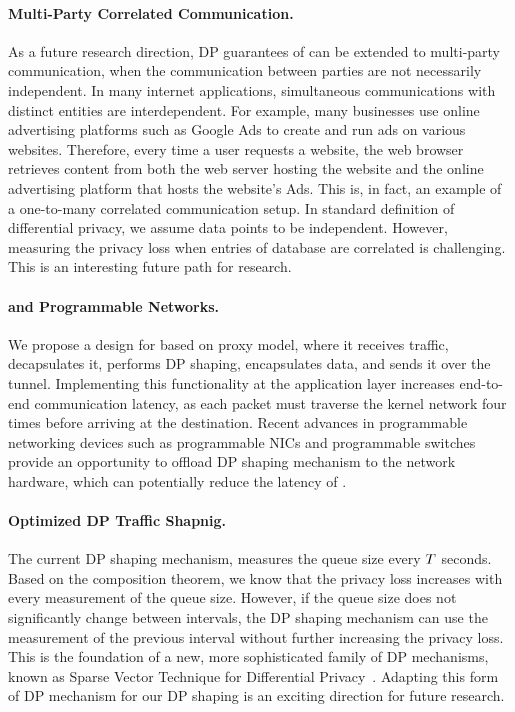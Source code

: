 \paragraph{Multi-Party Correlated Communication.}
As a future research direction, DP guarantees of {\sys} can be extended to multi-party communication, when the communication between parties are not necessarily independent.
In many internet applications,  simultaneous communications with distinct entities are interdependent.
For example, many businesses use online advertising platforms such as Google Ads to create and run ads on various websites.
Therefore, every time a user requests a website, the web browser retrieves content from both the web server hosting the website and the online advertising platform that hosts the website's Ads.   
This is, in fact, an example of a one-to-many correlated communication setup.
In standard definition of differential privacy, we assume data points to be independent.  
However, measuring the privacy loss when entries of database are correlated is challenging. 
This is an interesting future path for research.

\paragraph{{\sys} and Programmable Networks.}
We propose a design for {\sys} based on proxy model, where it receives traffic, decapsulates it, performs DP shaping, encapsulates data, and sends it over the tunnel.
Implementing this functionality at the application layer increases end-to-end communication latency, as each packet must traverse the kernel network four times before arriving at the destination.
Recent advances in programmable networking devices such as programmable NICs and programmable switches~\cite{meier2022ditto} provide an opportunity to offload DP shaping mechanism to the network hardware, which can potentially reduce the latency of {\sys}.

\paragraph{Optimized DP Traffic Shapnig.}
The current DP shaping mechanism, measures the queue size every $T$ seconds.
Based on the composition theorem, we know that the privacy loss increases with every measurement of the queue size. 
However, if the queue size does not significantly change between intervals, the DP shaping mechanism can use the measurement of the previous interval without further increasing the privacy loss. 
This is the foundation of a new, more sophisticated family of DP mechanisms, known as Sparse Vector Technique for Differential Privacy~\cite{lyu2016understanding}. 
Adapting this form of DP mechanism for our DP shaping is an exciting direction for future research.

